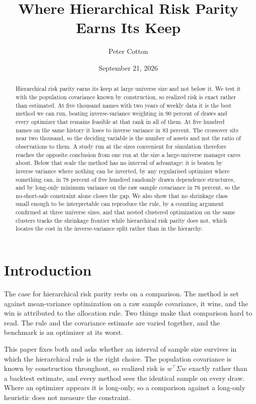 \documentclass[11pt]{article}
\title{Where Hierarchical Risk Parity Earns Its Keep}
\author{Peter Cotton}
\date{September 21, 2026}
\begin{document}
\maketitle

\begin{abstract}
Hierarchical risk parity earns its keep at large universe size and not below
it. We test it with the population covariance known by construction, so
realized risk is exact rather than estimated. At five thousand names with two
years of weekly data it is the best method we can run, beating
inverse-variance weighting in 90 percent of draws and every optimizer that
remains feasible at that rank in all of them. At five hundred names on the
same history it loses to inverse variance in 83 percent. The crossover sits
near two thousand, so the deciding variable is the number of assets and not
the ratio of observations to them. A study run at the sizes convenient for
simulation therefore reaches the opposite conclusion from one run at the size
a large-universe manager cares about. Below that scale the method has no
interval of advantage: it is beaten by inverse variance where nothing can be
inverted, by any regularised optimizer where something can, in 78 percent of
five hundred randomly drawn dependence structures, and by long-only minimum
variance on the raw sample covariance in 76 percent, so the no-short-sale
constraint alone closes the gap. We also show that no shrinkage class small
enough to be interpretable can reproduce the rule, by a counting argument
confirmed at three universe sizes, and that nested clustered optimization on
the same clusters tracks the shrinkage frontier while hierarchical risk
parity does not, which locates the cost in the inverse-variance split rather
than in the hierarchy.
\end{abstract}

\section{Introduction}

The case for hierarchical risk parity \parencite{lopezdeprado2016} rests on a comparison. The method is
set against mean-variance optimization on a raw sample covariance, it wins,
and the win is attributed to the allocation rule. Two things make that
comparison hard to read. The rule and the covariance estimate are varied
together, and the benchmark is an optimizer at its worst.

This paper fixes both and asks whether an interval of sample size survives in
which the hierarchical rule is the right choice. The population covariance is
known by construction throughout, so realized risk is $w^\top \Sigma w$
exactly rather than a backtest estimate, and every method sees the identical
sample on every draw. Where an optimizer appears it is long-only, so a
comparison against a long-only heuristic does not measure the constraint.
\end{document}

